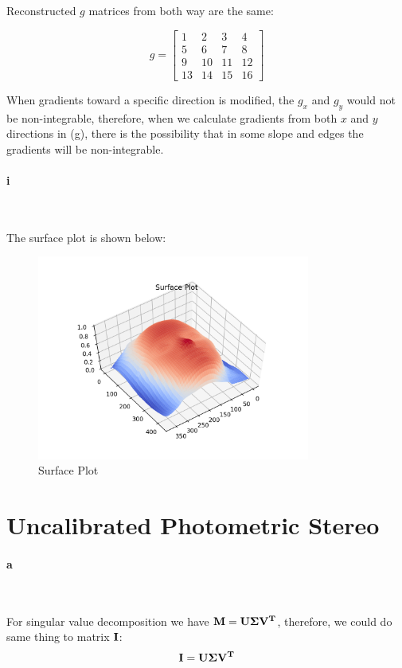 \documentclass[11pt]{article} \usepackage{fullpage} \usepackage{graphicx} \usepackage{epstopdf} \usepackage{color} \usepackage{psfrag} \usepackage{pdfsync}\usepackage{indentfirst}\usepackage{subfigure}\usepackage{float}\usepackage[section]{placeins}
\begin{document}
Reconstructed $g$ matrices from both way are the same:

\begin{equation}
	g = \begin{bmatrix} 1 & 2 & 3 & 4 \\ 5 & 6 & 7 & 8 \\ 9 & 10 & 11 & 12 \\ 13 & 14 & 15 & 16 \end{bmatrix}
\end{equation}

When gradients toward a specific direction is modified, the $g_x$ and $g_y$ would not be non-integrable, therefore, when we calculate gradients from both $x$ and $y$ directions in (g), there is the possibility that in some slope and edges the gradients will be non-integrable.

\paragraph{i}~{}

The surface plot is shown below:
\begin{figure}[H]
\centering
\includegraphics[width=0.8\textwidth]{results/q1i.png}
\caption{Surface Plot}
\end{figure}

\section{Uncalibrated Photometric Stereo}

\paragraph{a}~{}

For singular value decomposition we have $\bold{M} = \bold{U\Sigma V^\mathbf{T}}$, therefore, we could do same thing to matrix $\bold{I}$:
\begin{equation}
	\bold{I} = \bold{U\Sigma V^{\mathbf{T}}}
\end{equation}
\end{document}
